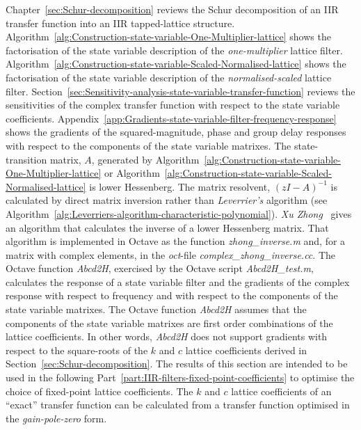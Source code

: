 \documentclass[a4paper,twoside,10pt,english]{report}
\begin{document}
Chapter~\ref{sec:Schur-decomposition} reviews the Schur decomposition of an IIR
transfer function into an IIR tapped-lattice structure.
Algorithm~\ref{alg:Construction-state-variable-One-Multiplier-lattice} shows the
factorisation of the state variable description of the \emph{one-multiplier}
lattice filter.
Algorithm~\ref{alg:Construction-state-variable-Scaled-Normalised-lattice} shows
the factorisation of the state variable description of the
\emph{normalised-scaled} lattice filter.
Section~\ref{sec:Sensitivity-analysis-state-variable-transfer-function} reviews
the sensitivities of the complex transfer function with respect to the state
variable coefficients.
Appendix~\ref{app:Gradients-state-variable-filter-frequency-response} shows the
gradients of the squared-magnitude, phase and group delay responses with respect
to the components of the state variable matrixes.  The state-transition matrix,
$A$, generated by
Algorithm~\ref{alg:Construction-state-variable-One-Multiplier-lattice} or
Algorithm~\ref{alg:Construction-state-variable-Scaled-Normalised-lattice} is
lower Hessenberg. The matrix resolvent, $\left(zI-A\right)^{-1}$ is calculated
by direct matrix inversion rather than \emph{Leverrier's} algorithm (see
Algorithm~\ref{alg:Leverriers-algorithm-characteristic-polynomial}).  
\emph{Xu Zhong}~\cite{Zhong_InversesOfHessenbergMatrices} gives an algorithm that
calculates the inverse of a lower Hessenberg matrix. That algorithm is
implemented in Octave as the function \emph{zhong\_inverse.m} and, for a matrix
with complex elements, in the \emph{oct}-file \emph{complex\_zhong\_inverse.cc}.
The Octave function \emph{Abcd2H}, exercised by the Octave script 
\emph{Abcd2H\_test.m}, calculates the response of a state
variable filter and the gradients of the complex response with respect to
frequency and with respect to the components of the state variable matrixes. The
Octave function \emph{Abcd2H} assumes that the components of the state variable
matrixes are first order combinations of the lattice coefficients. In other
words, \emph{Abcd2H} does not support gradients with respect to the square-roots
of the $k$ and $c$ lattice coefficients derived in
Section~\ref{sec:Schur-decomposition}. The results of this section are intended
to be used in the following Part~\ref{part:IIR-filters-fixed-point-coefficients}
to optimise the choice of fixed-point lattice coefficients. The $k$ and $c$
lattice coefficients of an ``exact'' transfer function can be calculated from a
transfer function optimised in the \emph{gain-pole-zero} form.
\end{document}
